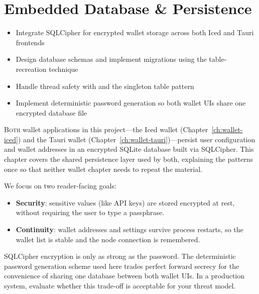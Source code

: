 \chapter{Embedded Database \& Persistence}
\label{ch:embedded-db}

\begin{learnbox}
\begin{itemize}
  \item Integrate SQLCipher for encrypted wallet storage across both Iced and Tauri frontends
  \item Design database schemas and implement migrations using the table-recreation technique
  \item Handle thread safety with  and the singleton table pattern
  \item Implement deterministic password generation so both wallet UIs share one encrypted database file
\end{itemize}
\end{learnbox}

\lettrine{B}{oth} wallet applications in this project---the Iced wallet (Chapter~\ref{ch:wallet-iced}) and the Tauri wallet (Chapter~\ref{ch:wallet-tauri})---persist user configuration and wallet addresses in an encrypted SQLite database built via SQLCipher. This chapter covers the shared persistence layer used by both, explaining the patterns once so that neither wallet chapter needs to repeat the material.

We focus on two reader-facing goals:

\begin{itemize}
  \item \textbf{Security}: sensitive values (like API keys) are stored encrypted at rest, without requiring the user to type a passphrase.
  \item \textbf{Continuity}: wallet addresses and settings survive process restarts, so the wallet list is stable and the node connection is remembered.
\end{itemize}

\begin{warnbox}
SQLCipher encryption is only as strong as the password. The deterministic password generation scheme used here trades perfect forward secrecy for the convenience of sharing one database between both wallet UIs. In a production system, evaluate whether this trade-off is acceptable for your threat model.
\end{warnbox}

